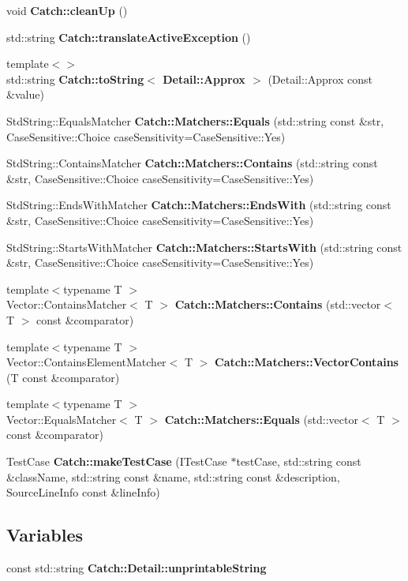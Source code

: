 \begin{DoxyCompactItemize}
\item 
void \textbf{ Catch\+::clean\+Up} ()
\item 
std\+::string \textbf{ Catch\+::translate\+Active\+Exception} ()
\item 
{\footnotesize template$<$$>$ }\\std\+::string \textbf{ Catch\+::to\+String$<$ Detail\+::\+Approx $>$} (Detail\+::\+Approx const \&value)
\item 
Std\+String\+::\+Equals\+Matcher \textbf{ Catch\+::\+Matchers\+::\+Equals} (std\+::string const \&str, Case\+Sensitive\+::\+Choice case\+Sensitivity=Case\+Sensitive\+::\+Yes)
\item 
Std\+String\+::\+Contains\+Matcher \textbf{ Catch\+::\+Matchers\+::\+Contains} (std\+::string const \&str, Case\+Sensitive\+::\+Choice case\+Sensitivity=Case\+Sensitive\+::\+Yes)
\item 
Std\+String\+::\+Ends\+With\+Matcher \textbf{ Catch\+::\+Matchers\+::\+Ends\+With} (std\+::string const \&str, Case\+Sensitive\+::\+Choice case\+Sensitivity=Case\+Sensitive\+::\+Yes)
\item 
Std\+String\+::\+Starts\+With\+Matcher \textbf{ Catch\+::\+Matchers\+::\+Starts\+With} (std\+::string const \&str, Case\+Sensitive\+::\+Choice case\+Sensitivity=Case\+Sensitive\+::\+Yes)
\item 
{\footnotesize template$<$typename T $>$ }\\Vector\+::\+Contains\+Matcher$<$ T $>$ \textbf{ Catch\+::\+Matchers\+::\+Contains} (std\+::vector$<$ T $>$ const \&comparator)
\item 
{\footnotesize template$<$typename T $>$ }\\Vector\+::\+Contains\+Element\+Matcher$<$ T $>$ \textbf{ Catch\+::\+Matchers\+::\+Vector\+Contains} (T const \&comparator)
\item 
{\footnotesize template$<$typename T $>$ }\\Vector\+::\+Equals\+Matcher$<$ T $>$ \textbf{ Catch\+::\+Matchers\+::\+Equals} (std\+::vector$<$ T $>$ const \&comparator)
\item 
Test\+Case \textbf{ Catch\+::make\+Test\+Case} (I\+Test\+Case $\ast$test\+Case, std\+::string const \&class\+Name, std\+::string const \&name, std\+::string const \&description, Source\+Line\+Info const \&line\+Info)
\end{DoxyCompactItemize}
\subsection*{Variables}
\begin{DoxyCompactItemize}
\item 
const std\+::string \textbf{ Catch\+::\+Detail\+::unprintable\+String}
\end{DoxyCompactItemize}


